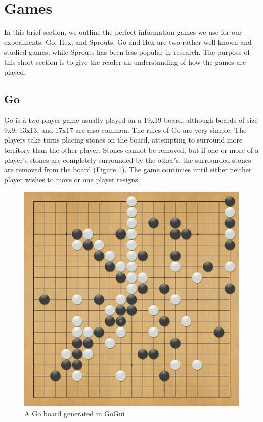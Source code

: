 
\section{Games}\label{sec:goals}
In this brief section, we outline the perfect information games we use for our experiments: Go, Hex, and Sprouts.  Go and Hex are two rather well-known and studied games, while Sprouts has been less popular in research.  The purpose of this short section is to give the reader an understanding of how the games are played.

\subsection{Go}
Go is a two-player game usually played on a 19x19 board, although boards of size 9x9, 13x13, and 17x17 are also common.  The rules of Go are very simple.  The players take turns placing stones on the board, attempting to surround more territory than the other player.  Stones cannot be removed, but if one or more of a player's stones are completely surrounded by the other's, the surrounded stones are removed from the board (Figure \ref{ref:gogui}).  The game continues until either neither player wishes to move or one player resigns.

\begin{figure}[h]
\centering
\includegraphics[scale=0.25]{images/gogui.png}
\caption{A Go board generated in GoGui}
\label{ref:gogui}
\end{figure}

